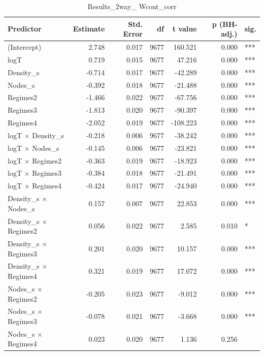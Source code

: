 \begin{table}[ht]
\centering
\begin{tabular}{lrrrrrl}
  \hline
Predictor & Estimate & Std. Error & df & t value & p (BH-adj.) & sig. \\ 
  \hline
(Intercept) & 2.748 & 0.017 & 9677 & 160.521 & 0.000 & *** \\ 
  logT & 0.719 & 0.015 & 9677 & 47.216 & 0.000 & *** \\ 
  Density\_s & -0.714 & 0.017 & 9677 & -42.289 & 0.000 & *** \\ 
  Nodes\_s & -0.392 & 0.018 & 9677 & -21.488 & 0.000 & *** \\ 
  Regimes2 & -1.466 & 0.022 & 9677 & -67.756 & 0.000 & *** \\ 
  Regimes3 & -1.813 & 0.020 & 9677 & -90.397 & 0.000 & *** \\ 
  Regimes4 & -2.052 & 0.019 & 9677 & -108.223 & 0.000 & *** \\ 
  logT × Density\_s & -0.218 & 0.006 & 9677 & -38.242 & 0.000 & *** \\ 
  logT × Nodes\_s & -0.145 & 0.006 & 9677 & -23.821 & 0.000 & *** \\ 
  logT × Regimes2 & -0.363 & 0.019 & 9677 & -18.923 & 0.000 & *** \\ 
  logT × Regimes3 & -0.384 & 0.018 & 9677 & -21.491 & 0.000 & *** \\ 
  logT × Regimes4 & -0.424 & 0.017 & 9677 & -24.940 & 0.000 & *** \\ 
  Density\_s × Nodes\_s & 0.157 & 0.007 & 9677 & 22.853 & 0.000 & *** \\ 
  Density\_s × Regimes2 & 0.056 & 0.022 & 9677 & 2.585 & 0.010 & * \\ 
  Density\_s × Regimes3 & 0.201 & 0.020 & 9677 & 10.157 & 0.000 & *** \\ 
  Density\_s × Regimes4 & 0.321 & 0.019 & 9677 & 17.072 & 0.000 & *** \\ 
  Nodes\_s × Regimes2 & -0.205 & 0.023 & 9677 & -9.012 & 0.000 & *** \\ 
  Nodes\_s × Regimes3 & -0.078 & 0.021 & 9677 & -3.668 & 0.000 & *** \\ 
  Nodes\_s × Regimes4 & 0.023 & 0.020 & 9677 & 1.136 & 0.256 &  \\ 
   \hline
\end{tabular}
\caption{Results_2way_ Wcont_corr} 
\end{table}
